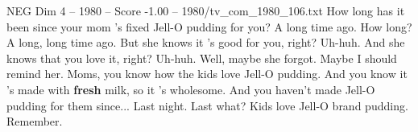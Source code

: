 \begin{textsample}{NEG Dim 4 – 1980 – Score -1.00 – 1980/tv\_com\_1980\_106.txt}  \label{ex:f4_neg_036}
How long has it been since your mom 's fixed Jell-O pudding for you?
A long time ago.
How long?
A long, long time ago.
But she knows it 's good for you, right?
Uh-huh.
And she knows that you love it, right?
Uh-huh.
Well, maybe she forgot.
Maybe I should remind her.
Moms, you know how the kids love Jell-O pudding.
And you know it 's made with \textbf{fresh} milk, so it 's wholesome.
And you haven't made Jell-O pudding for them since...
Last night.
Last what?
Kids love Jell-O brand pudding.
Remember.

\end{textsample}
